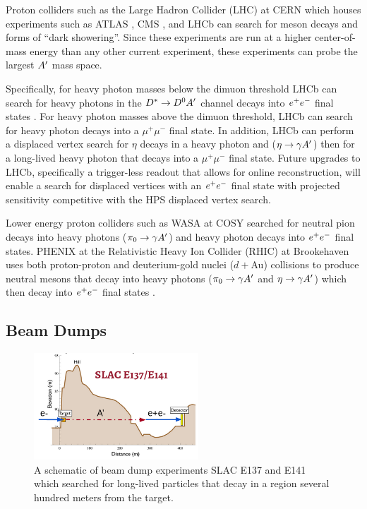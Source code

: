 Proton colliders such as the Large Hadron Collider (LHC) at CERN which houses experiments such as ATLAS  \cite{Aad:2012tfa}, CMS \cite{Chatrchyan:2012xdj}, and LHCb can search for meson decays and forms of ``dark showering''. Since these experiments are run at a higher center-of-mass energy than any other current experiment, these experiments can probe the largest $A^\prime$ mass space. 

Specifically, for heavy photon masses below the dimuon threshold LHCb can search for heavy photons in the $D^* \rightarrow D^0 A^\prime$ channel decays into $e^{+}e^{-}$ final states \cite{Ilten:2015hya} \cite{Ilten:2016tkc} \cite{PhysRevLett.120.061801}. For heavy photon masses above the dimuon threshold, LHCb can search for heavy photon decays into a $\mu^+ \mu^-$ final state. In addition, LHCb can perform a displaced vertex search for $\eta$ decays in a heavy photon and ($\eta \rightarrow \gamma A^\prime$) then for a long-lived heavy photon that decays into a $\mu^+ \mu^-$ final state. Future upgrades to LHCb, specifically a trigger-less readout that allows for online reconstruction, will enable a search for displaced vertices with an $e^{+}e^{-}$ final state with projected sensitivity competitive with the HPS displaced vertex search.

Lower energy proton colliders such as WASA at COSY searched for neutral pion decays into heavy photons ($\pi_0 \rightarrow \gamma A^\prime$) and heavy photon decays into $e^{+}e^{-}$ final states. PHENIX at the Relativistic Heavy Ion Collider (RHIC) at Brookehaven uses both proton-proton and deuterium-gold nuclei ($d+$Au) collisions to produce neutral mesons that decay into heavy photons ($\pi_0 \rightarrow \gamma A^\prime$ and $\eta \rightarrow \gamma A^\prime$) which then decay into $e^{+}e^{-}$ final states \cite{Adare:2014mgk}. 


\subsection{Beam Dumps}\label{sec:beamdump}

 \begin{figure}
    \centering
    \includegraphics[width=0.55\textwidth]{figs/motivation/beamdump.png}
    \caption{A schematic of beam dump experiments SLAC E137 and E141 which searched for long-lived particles that decay in a region several hundred meters from the target.}
    \label{fig:beamdump}
\end{figure}

